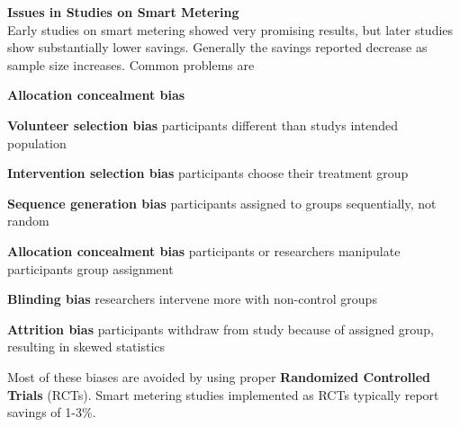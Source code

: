 \begin{tcolorbox}
\textbf{Issues in Studies on Smart Metering}\\
Early studies on smart metering showed very promising results, but later studies show substantially lower savings.
Generally the savings reported decrease as sample size increases.
Common problems are

\begin{labeling}{\textbf{Allocation concealment bias}}
    \item [\textbf{Volunteer selection bias}]
    participants different than studys intended population
    \item [\textbf{Intervention selection bias}]
    participants choose their treatment group
    \item [\textbf{Sequence generation bias}]
    participants assigned to groups sequentially, not random
    \item [\textbf{Allocation concealment bias}]
    participants or researchers manipulate participants group assignment
    \item [\textbf{Blinding bias}]
    researchers intervene more with non-control groups
    \item [\textbf{Attrition bias}]
    participants withdraw from study because of assigned group, resulting in skewed statistics
\end{labeling}

 Most of these biases are avoided by using proper \textbf{Randomized Controlled Trials} (RCTs). Smart metering studies implemented as RCTs typically report savings of 1-3\%.

\end{tcolorbox}

